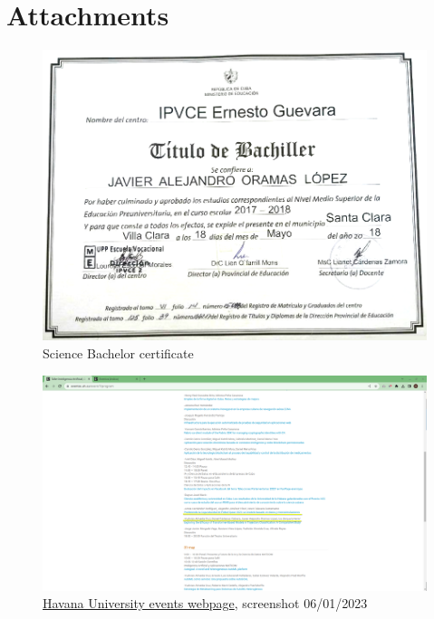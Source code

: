 \section*{Attachments}
\begin{figure}[h]
    \includegraphics[width=\textwidth]{images/bachelor.png}
    \caption{Science Bachelor certificate}
    \label{sec:bachelor}
\end{figure}

\begin{figure}[h]
    \includegraphics[width=\textwidth]{images/ai_workshop.png}
    \caption{\href{https://eventos.uh.cu/event/7/program}{Havana University events webpage}, screenshot 06/01/2023}
    \label{sec:workshop}
\end{figure}

